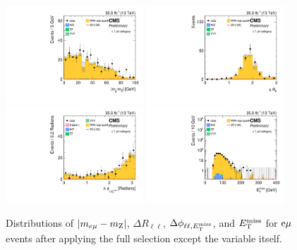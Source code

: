 \begin{figure}[hbtp]
 \begin{center}
   \includegraphics[width=0.46\textwidth]{figures/em_zh_1j_mll_allcutsbutone.pdf}
   \includegraphics[width=0.46\textwidth]{figures/em_zh_1j_deltarll_allcutsbutone.pdf}\\
   \includegraphics[width=0.46\textwidth]{figures/em_zh_1j_dphillmet_allcutsbutone.pdf}
   \includegraphics[width=0.46\textwidth]{figures/em_zh_1j_met_allcutsbutone.pdf}
 \end{center}
 \caption{Distributions of $|m_{e\mu}-m_{\mathrm{Z}}|$,
        $\Delta R_{\ell\ell}$,
        $\Delta \phi_{\ell\ell,E_\mathrm{T}^{\mathrm{miss}}}$,
        and $E_\mathrm{T}^{\mathrm{miss}}$ for $\mathrm{e} \mu$ events after applying the full selection except the variable itself.}
\label{fig:m_em}
\end{figure}

